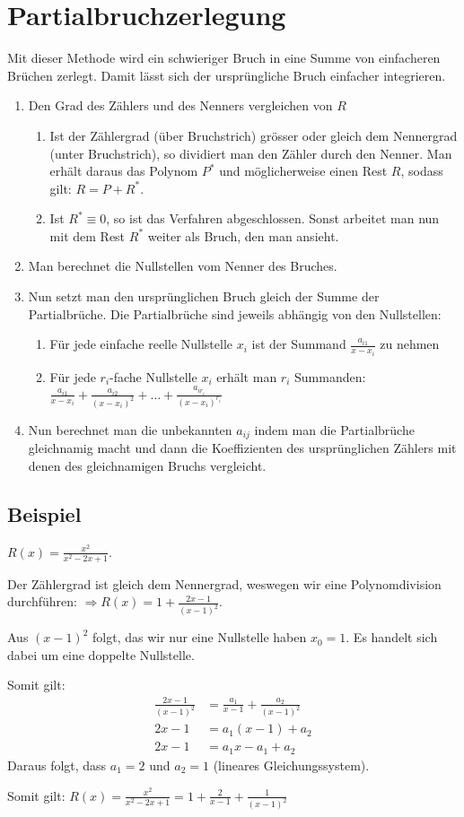 \section{Partialbruchzerlegung}
Mit dieser Methode wird ein schwieriger Bruch in eine Summe von einfacheren
Brüchen zerlegt. Damit lässt sich der ursprüngliche Bruch einfacher integrieren.

\begin{enumerate}
	\item Den Grad des Zählers und des Nenners vergleichen von $R$
	\begin{enumerate}
		\item Ist der Zählergrad (über Bruchstrich) grösser oder gleich dem Nennergrad
		(unter Bruchstrich), so dividiert man den Zähler durch den Nenner. Man erhält
		daraus das Polynom $P^*$ und möglicherweise einen Rest $R$, sodass gilt: $R =
		P + R^*$.
		\item Ist $R^* \equiv 0$, so ist das Verfahren abgeschlossen. Sonst arbeitet
		man nun mit dem Rest $R^*$ weiter als Bruch, den man ansieht.
	\end{enumerate}
	\item Man berechnet die Nullstellen vom Nenner des Bruches.
	\item Nun setzt man den ursprünglichen Bruch gleich der Summe der
	Partialbrüche. Die Partialbrüche sind jeweils abhängig von den Nullstellen:
	\begin{enumerate}
		\item Für jede einfache reelle Nullstelle $x_i$ ist der Summand
		$\frac{a_{i1}}{x-x_i}$ zu nehmen
		\item Für jede $r_i$-fache Nullstelle $x_i$ erhält man $r_i$ Summanden:
		$\frac{a_{i1}}{x-x_i} + \frac{a_{i2}}{(x-x_i)^2} + \ldots +
		\frac{a_{ir_i}}{(x-x_i)^{r_i}}$
	\end{enumerate}
	\item Nun berechnet man die unbekannten $a_{ij}$ indem man die Partialbrüche
	gleichnamig macht und dann die Koeffizienten des ursprünglichen Zählers mit
	denen des gleichnamigen Bruchs vergleicht.
\end{enumerate}

\subsection*{Beispiel}
$R(x) = \frac{x^2}{x^2-2x+1}$.

Der Zählergrad ist gleich dem Nennergrad,
weswegen wir eine Polynomdivision durchführen: $\Rightarrow R(x) = 1 +
\frac{2x-1}{(x-1)^2}$.

Aus $(x-1)^2$ folgt, das wir nur eine Nullstelle haben $x_0 = 1$. Es handelt
sich dabei um eine doppelte Nullstelle.

Somit gilt:
\begin{align*}
\frac{2x-1}{(x-1)^2} &= \frac{a_1}{x-1} + \frac{a_2}{(x-1)^2}\\
2x-1 &= a_1(x-1) + a_2\\
2x-1 &= a_1 x - a_1 + a_2
\end{align*}
Daraus folgt, dass $a_1 = 2$ und $a_2 = 1$ (lineares Gleichungssystem).

Somit gilt: $R(x) = \frac{x^2}{x^2-2x+1} = 1 + \frac{2}{x-1} +
\frac{1}{(x-1)^2}$
